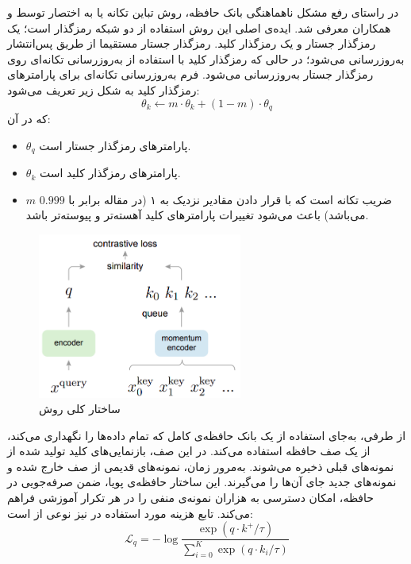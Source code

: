 در راستای رفع مشکل ناهماهنگی بانک حافظه، روش تباین تکانه یا به اختصار
توسط  و همکاران\cite{he2020momentum} معرفی شد.
ایده‌ی اصلی این روش استفاده از دو شبکه رمزگذار است؛
یک رمزگذار جستار
و یک رمزگذار کلید.
رمزگذار جستار مستقیما از طریق پس‌انتشار به‌روزرسانی می‌شود؛ در حالی که رمزگذار کلید با استفاده از به‌روزرسانی تکانه‌ای روی رمزگذار جستار به‌روزرسانی می‌شود. فرم به‌روزرسانی تکانه‌ای برای پارامترهای رمزگذار کلید به شکل زیر تعریف می‌شود:
\begin{equation}
\theta_k \leftarrow m \cdot \theta_k + (1 - m) \cdot \theta_q
\end{equation}
که در آن:
\begin{itemize}
    \item $\theta_q$ پارامترهای رمزگذار جستار است.
    \item $\theta_k$ پارامترهای رمزگذار کلید است.
    \item $m$ ضریب تکانه است که با قرار دادن مقادیر نزدیک به ۱ (در مقاله برابر با $0.999$ می‌باشد) باعث می‌شود تغییرات پارامترهای کلید آهسته‌تر و پیوسته‌تر باشد.
\end{itemize}
\begin{figure}[htb!]
\centering
\includegraphics[width=0.6\textwidth]{Images/Chapter2/moco.png}
\caption{ساختار کلی روش }
\label{fig:moco}
\end{figure}
از طرفی، 
به‌جای استفاده از یک بانک حافظه‌ی کامل که تمام داده‌ها را نگهداری می‌کند،
از یک صف حافظه
استفاده می‌کند. در این صف، بازنمایی‌های کلید تولید شده از نمونه‌های قبلی ذخیره می‌شوند. به‌مرور زمان، نمونه‌های قدیمی از صف خارج شده و نمونه‌های جدید جای آن‌ها را می‌گیرند. این ساختار حافظه‌ی پویا، ضمن صرفه‌جویی در حافظه، امکان دسترسی به هزاران نمونه‌ی منفی را در هر تکرار آموزشی فراهم می‌کند. تابع هزینه مورد استفاده در 
نیز نوعی از  است:
\begin{equation}
\mathcal{L}_q = -\log \frac{\exp(q \cdot k^+ / \tau)}{\sum_{i=0}^{K} \exp(q \cdot k_i / \tau)}
\end{equation}
